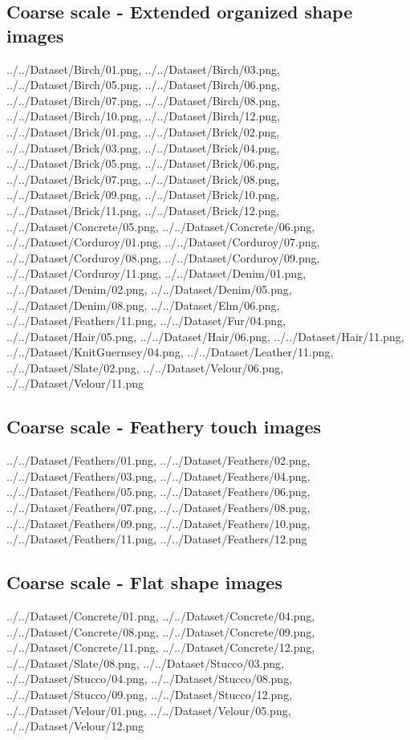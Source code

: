 \newpage
\subsection{Coarse scale - Extended organized shape images}
{../../Dataset/Birch/01.png,
../../Dataset/Birch/03.png,
../../Dataset/Birch/05.png,
../../Dataset/Birch/06.png,
../../Dataset/Birch/07.png,
../../Dataset/Birch/08.png,
../../Dataset/Birch/10.png,
../../Dataset/Birch/12.png,
../../Dataset/Brick/01.png,
../../Dataset/Brick/02.png,
../../Dataset/Brick/03.png,
../../Dataset/Brick/04.png,
../../Dataset/Brick/05.png,
../../Dataset/Brick/06.png,
../../Dataset/Brick/07.png,
../../Dataset/Brick/08.png,
../../Dataset/Brick/09.png,
../../Dataset/Brick/10.png,
../../Dataset/Brick/11.png,
../../Dataset/Brick/12.png,
../../Dataset/Concrete/05.png,
../../Dataset/Concrete/06.png,
../../Dataset/Corduroy/01.png,
../../Dataset/Corduroy/07.png,
../../Dataset/Corduroy/08.png,
../../Dataset/Corduroy/09.png,
../../Dataset/Corduroy/11.png,
../../Dataset/Denim/01.png,
../../Dataset/Denim/02.png,
../../Dataset/Denim/05.png,
../../Dataset/Denim/08.png,
../../Dataset/Elm/06.png,
../../Dataset/Feathers/11.png,
../../Dataset/Fur/04.png,
../../Dataset/Hair/05.png,
../../Dataset/Hair/06.png,
../../Dataset/Hair/11.png,
../../Dataset/KnitGuernsey/04.png,
../../Dataset/Leather/11.png,
../../Dataset/Slate/02.png,
../../Dataset/Velour/06.png,
../../Dataset/Velour/11.png}

\newpage
\subsection{Coarse scale - Feathery touch images}
{../../Dataset/Feathers/01.png,
../../Dataset/Feathers/02.png,
../../Dataset/Feathers/03.png,
../../Dataset/Feathers/04.png,
../../Dataset/Feathers/05.png,
../../Dataset/Feathers/06.png,
../../Dataset/Feathers/07.png,
../../Dataset/Feathers/08.png,
../../Dataset/Feathers/09.png,
../../Dataset/Feathers/10.png,
../../Dataset/Feathers/11.png,
../../Dataset/Feathers/12.png}

\newpage
\subsection{Coarse scale - Flat shape images}
{../../Dataset/Concrete/01.png,
../../Dataset/Concrete/04.png,
../../Dataset/Concrete/08.png,
../../Dataset/Concrete/09.png,
../../Dataset/Concrete/11.png,
../../Dataset/Concrete/12.png,
../../Dataset/Slate/08.png,
../../Dataset/Stucco/03.png,
../../Dataset/Stucco/04.png,
../../Dataset/Stucco/08.png,
../../Dataset/Stucco/09.png,
../../Dataset/Stucco/12.png,
../../Dataset/Velour/01.png,
../../Dataset/Velour/05.png,
../../Dataset/Velour/12.png}

